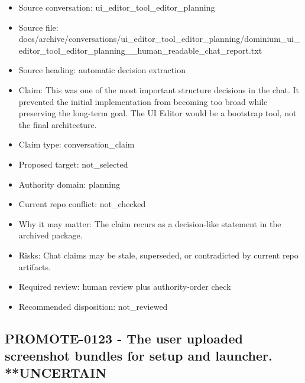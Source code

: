 \documentclass[11pt,a4paper]{report}
\begin{document}
\begin{itemize}
\item Source conversation: ui\_editor\_tool\_editor\_planning
\item Source file: docs/archive/conversations/ui\_editor\_tool\_editor\_planning/dominium\_ui\_editor\_tool\_editor\_planning\_\_human\_readable\_chat\_report.txt
\item Source heading: automatic decision extraction
\item Claim: This was one of the most important structure decisions in the chat. It prevented the initial implementation from becoming too broad while preserving the long-term goal. The UI Editor would be a bootstrap tool, not the final architecture.
\item Claim type: conversation\_claim
\item Proposed target: not\_selected
\item Authority domain: planning
\item Current repo conflict: not\_checked
\item Why it may matter: The claim recurs as a decision-like statement in the archived package.
\item Risks: Chat claims may be stale, superseded, or contradicted by current repo artifacts.
\item Required review: human review plus authority-order check
\item Recommended disposition: not\_reviewed
\end{itemize}

\subsection{PROMOTE-0123 - The user uploaded screenshot bundles for setup and launcher. **UNCERTAIN}
\end{document}
